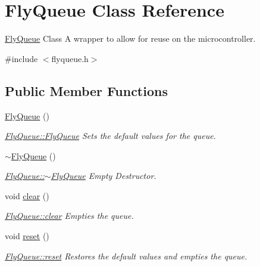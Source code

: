 \hypertarget{class_fly_queue}{}\section{Fly\+Queue Class Reference}
\label{class_fly_queue}


\hyperlink{class_fly_queue}{Fly\+Queue} Class A wrapper to allow for reuse on the microcontroller.  




{\ttfamily \#include $<$flyqueue.\+h$>$}

\subsection*{Public Member Functions}
\begin{DoxyCompactItemize}
\item 
\hyperlink{class_fly_queue_adc5d5138e7023af3697e3275b25d78d0}{Fly\+Queue} ()
\begin{DoxyCompactList}\small\item\em \hyperlink{class_fly_queue_adc5d5138e7023af3697e3275b25d78d0}{Fly\+Queue\+::\+Fly\+Queue} Sets the default values for the queue. \end{DoxyCompactList}\item 
\hyperlink{class_fly_queue_aba6188b6f39aac0a1386e72d30f0dd74}{$\sim$\+Fly\+Queue} ()
\begin{DoxyCompactList}\small\item\em \hyperlink{class_fly_queue_aba6188b6f39aac0a1386e72d30f0dd74}{Fly\+Queue\+::$\sim$\+Fly\+Queue} Empty Destructor. \end{DoxyCompactList}\item 
void \hyperlink{class_fly_queue_ae4112aad97978a82e09f6ad5cfe7f5dc}{clear} ()
\begin{DoxyCompactList}\small\item\em \hyperlink{class_fly_queue_ae4112aad97978a82e09f6ad5cfe7f5dc}{Fly\+Queue\+::clear} Empties the queue. \end{DoxyCompactList}\item 
void \hyperlink{class_fly_queue_ac3f3e14584bf80481cb9fc9e0c14019a}{reset} ()
\begin{DoxyCompactList}\small\item\em \hyperlink{class_fly_queue_ac3f3e14584bf80481cb9fc9e0c14019a}{Fly\+Queue\+::reset} Restores the default values and empties the queue. \end{DoxyCompactList}\item 

\end{DoxyCompactItemize}
